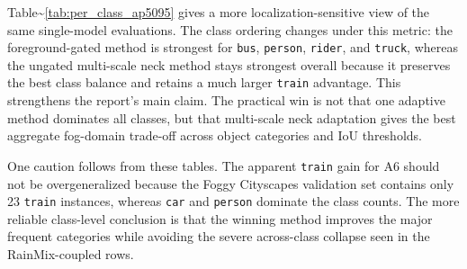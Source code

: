 \documentclass[
  11pt,
]{article}
\begin{document}
Table\textasciitilde{}\ref{tab:per_class_ap5095} gives a more
localization-sensitive view of the same single-model evaluations. The
class ordering changes under this metric: the foreground-gated method is
strongest for \texttt{bus}, \texttt{person}, \texttt{rider}, and
\texttt{truck}, whereas the ungated multi-scale neck method stays
strongest overall because it preserves the best class balance and
retains a much larger \texttt{train} advantage. This strengthens the
report's main claim. The practical win is not that one adaptive method
dominates all classes, but that multi-scale neck adaptation gives the
best aggregate fog-domain trade-off across object categories and IoU
thresholds.

\begin{table}[!t]
\centering
\caption{Per-class AP@0.5:0.95 on Foggy Cityscapes. Best values are shown in bold.}
\label{tab:per_class_ap5095}
\scriptsize
\setlength{\tabcolsep}{3.2pt}
\end{table}

One caution follows from these tables. The apparent \texttt{train} gain
for A6 should not be overgeneralized because the Foggy Cityscapes
validation set contains only 23 \texttt{train} instances, whereas
\texttt{car} and \texttt{person} dominate the class counts. The more
reliable class-level conclusion is that the winning method improves the
major frequent categories while avoiding the severe across-class
collapse seen in the RainMix-coupled rows.
\end{document}
